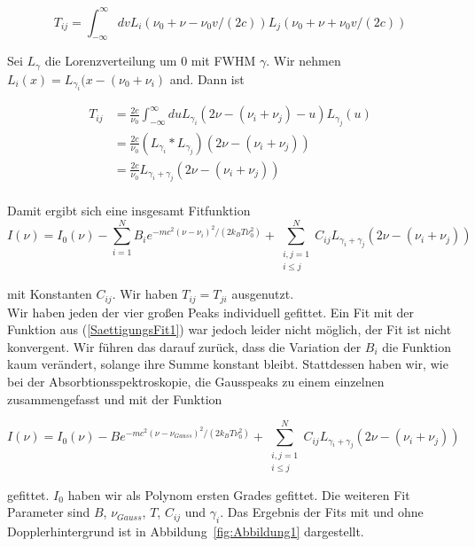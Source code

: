 \documentclass[a4paper,parskip]{scrartcl}
\begin{document}
$$T_{ij}=\int_{-\infty}^\infty dv L_i(\nu_0+\nu-\nu_0 v/(2c)) L_j(\nu_0+\nu+\nu_0 v/(2c))$$

Sei $L_\gamma$ die Lorenzverteilung um 0 mit FWHM $\gamma$. Wir nehmen $L_i(x) = L_{\gamma_i}(x-(\nu_0+\nu_i)$ and. Dann ist

\begin{align*}
T_{ij} &= \frac{2c}{\nu_0}\int_{-\infty}^\infty du L_{\gamma_i}(2\nu-(\nu_i+\nu_j)-u)L_{\gamma_j}(u)\\
&= \frac{2c}{\nu_0} (L_{\gamma_i} * L_{\gamma_j})(2\nu-(\nu_i+\nu_j)) \\
&= \frac{2c}{\nu_0} L_{\gamma_i+\gamma_j}(2\nu-(\nu_i+\nu_j)) \\
\end{align*}

Damit ergibt sich eine insgesamt Fitfunktion
\begin{equation}
I(\nu) = I_0(\nu)-\sum_{i=1}^N B_i e^{-mc^2(\nu-\nu_i)^2/(2k_BT\nu_0^2)} +\sum_{\substack{i,j=1\\i\leq j}}^N C_{ij} L_{\gamma_i+\gamma_j}(2\nu-(\nu_i+\nu_j))
\label{SaettigungsFit1}
\end{equation}


mit Konstanten $C_{ij}$. Wir haben $T_{ij}=T_{ji}$ ausgenutzt.\\

Wir haben jeden der vier großen Peaks individuell gefittet. Ein Fit mit der Funktion aus (\ref{SaettigungsFit1}) war jedoch leider nicht möglich, der Fit ist nicht konvergent. Wir führen das darauf zurück, dass die Variation der $B_i$ die Funktion kaum verändert, solange ihre Summe konstant bleibt. Stattdessen haben wir, wie bei der Absorbtionsspektroskopie, die Gausspeaks zu einem einzelnen zusammengefasst und mit der Funktion

 \begin{equation}
I(\nu) = I_0(\nu)-B e^{-mc^2(\nu-\nu_{Gauss})^2/(2k_BT\nu_0^2)} +\sum_{\substack{i,j=1\\i\leq j}}^N C_{ij} L_{\gamma_i+\gamma_j}(2\nu-(\nu_i+\nu_j))
\label{SaettigungsFit2}
\end{equation}

gefittet. $I_0$ haben wir als Polynom ersten Grades gefittet. Die weiteren Fit Parameter sind $B$, $\nu_{Gauss}$, $T$, $C_{ij}$ und $\gamma_i$. Das Ergebnis der Fits mit und ohne Dopplerhintergrund ist in Abbildung~\ref{fig:Abbildung1} dargestellt.
\end{document}
